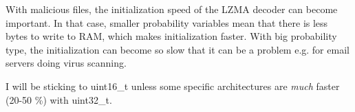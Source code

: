 With malicious files, the initialization speed of the L\+Z\+MA decoder can become important. In that case, smaller probability variables mean that there is less bytes to write to R\+AM, which makes initialization faster. With big probability type, the initialization can become so slow that it can be a problem e.\+g. for email servers doing virus scanning.

I will be sticking to uint16\+\_\+t unless some specific architectures are {\itshape much} faster (20-\/50 \%) with uint32\+\_\+t. 
